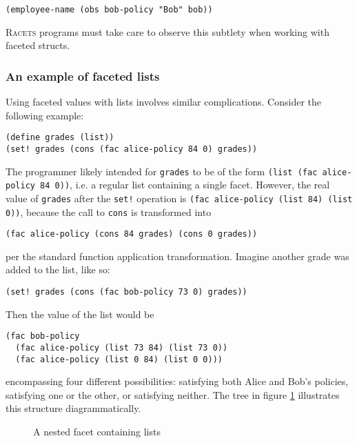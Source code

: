 \documentclass{article}
\begin{document}
\begin{lstlisting}
(employee-name (obs bob-policy "Bob" bob))
\end{lstlisting}

\textsc{Racets} programs must take care to observe this subtlety when working with faceted structs.


\subsubsection{An example of faceted lists}
Using faceted values with lists involves similar complications. Consider the following example:

\begin{lstlisting}
(define grades (list))
(set! grades (cons (fac alice-policy 84 0) grades))
\end{lstlisting}

The programmer likely intended for \texttt{grades} to be of the form \texttt{(list (fac alice-policy 84 0))}, i.e. a regular list containing a single facet. However, the real value of \texttt{grades} after the \texttt{set!} operation is \texttt{(fac alice-policy (list 84) (list 0))}, because the call to \texttt{cons} is transformed into

\begin{lstlisting}
(fac alice-policy (cons 84 grades) (cons 0 grades))
\end{lstlisting}

\noindent per the standard function application transformation. Imagine another grade was added to the list, like so:

\begin{lstlisting}
(set! grades (cons (fac bob-policy 73 0) grades))
\end{lstlisting}

Then the value of the list would be

\begin{lstlisting}
(fac bob-policy
  (fac alice-policy (list 73 84) (list 73 0))
  (fac alice-policy (list 0 84) (list 0 0)))
\end{lstlisting}

\noindent encompassing four different possibilities: satisfying both Alice and Bob's policies, satisfying one or the other, or satisfying neither. The tree in figure \ref{figure:nested-list} illustrates this structure diagrammatically.

\begin{figure}[h]
\begin{center}
	\caption{A nested facet containing lists}
	\label{figure:nested-list}
\end{center}
\end{figure}
\end{document}
